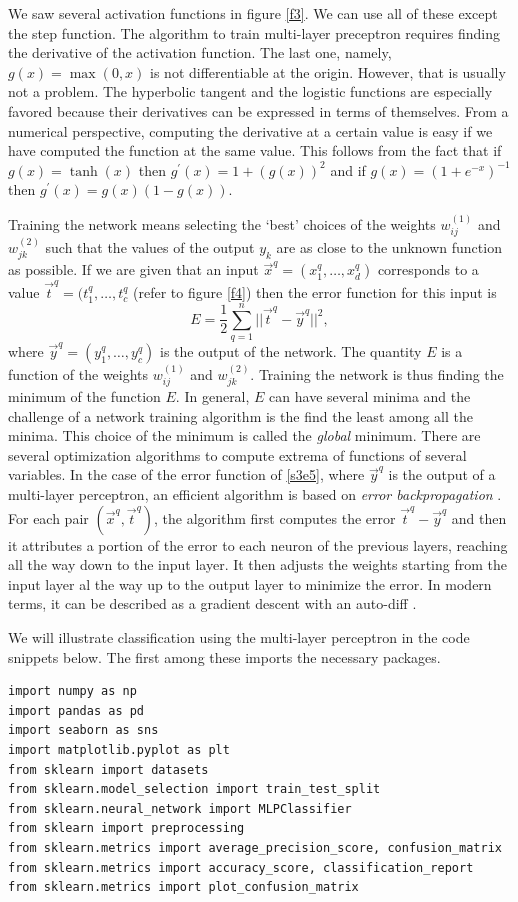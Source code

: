 \documentclass{article}
\numberwithin{equation}{section}
\begin{document}
We saw several activation functions in figure \ref{f3}. We can use all of
these except the step function. The algorithm to train multi-layer preceptron 
requires finding the 
derivative of the activation function. The last one, namely, $g(x)=\max(0, x)$ 
is not differentiable at the origin. However, that is usually not a problem. 
The hyperbolic tangent and the logistic functions are especially favored because
their derivatives can be expressed in terms of themselves. From a numerical
perspective, computing the derivative at a certain value is easy if we have
computed the function at the same value. This follows from the fact that if
$g(x) = \tanh(x)$ then $g^\prime(x) = 1 + (g(x))^2$ and if $g(x) =
(1+e^{-x})^{-1}$ then $g^\prime(x) = g(x)(1 - g(x))$.

Training the network means selecting the `best' choices of the weights 
$w^{(1)}_{ij}$ and $w^{(2)}_{jk}$ such that the values of the output $y_k$ 
are as close to the unknown function as possible. If we are given that an
input $\vec{x}^q = (x_1^q, \ldots, x_d^q)$ corresponds to a value $\vec{t}^q
= (t_1^q, \ldots, t_c^q$ (refer to figure \ref{f4}) then the error function
for this input is
\begin{equation}\label{s3e5}
E = \frac{1}{2}\sum_{q=1}^n ||\vec{t}^q - \vec{y}^q||^2,
\end{equation}
where $\vec{y}^q = (y_1^q, \ldots, y_c^q)$ is the output of the network. The
quantity $E$ is a function of the weights $w^{(1)}_{ij}$ and $w^{(2)}_{jk}$.
Training the network is thus finding the minimum of the function $E$. In 
general, $E$ can have several minima and the challenge of a network training
algorithm is the find the least among all the minima. This choice of the
minimum is called the \emph{global} minimum. There are several optimization
algorithms to compute extrema of functions of several variables. In the case
of the error function of \eqref{s3e5}, where $\vec{y}^q$ is the output of a
multi-layer perceptron, an efficient algorithm is based on \emph{error
backpropagation} \cite{rumelhart1985learning}. For each pair $(\vec{x}^q, 
\vec{t}^q)$, the algorithm first computes the error $\vec{t}^q - \vec{y}^q$
and then it attributes a portion of the error to each neuron of the previous
layers, reaching all the way down to the input layer. It then adjusts the 
weights starting from the input layer al the way up to the output layer to 
minimize the error. In modern terms, it can be described as a gradient descent 
with an auto-diff \cite{geron2019hands}.

We will illustrate classification using the multi-layer perceptron in the
code snippets below. The first among these imports the necessary packages.
\begin{verbatim}
import numpy as np
import pandas as pd
import seaborn as sns
import matplotlib.pyplot as plt
from sklearn import datasets
from sklearn.model_selection import train_test_split
from sklearn.neural_network import MLPClassifier
from sklearn import preprocessing
from sklearn.metrics import average_precision_score, confusion_matrix
from sklearn.metrics import accuracy_score, classification_report
from sklearn.metrics import plot_confusion_matrix
\end{verbatim}
\end{document}
